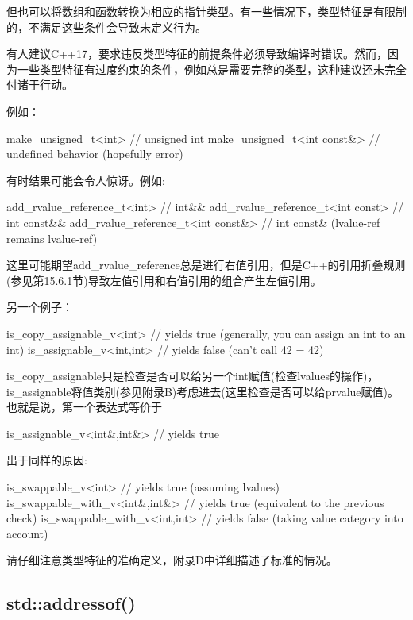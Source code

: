 但也可以将数组和函数转换为相应的指针类型。有一些情况下，类型特征是有限制的，不满足这些条件会导致未定义行为。

\begin{notice}
有人建议C++17，要求违反类型特征的前提条件必须导致编译时错误。然而，因为一些类型特征有过度约束的条件，例如总是需要完整的类型，这种建议还未完全付诸于行动。
\end{notice}

例如：

\begin{cpp}
make_unsigned_t<int> // unsigned int
make_unsigned_t<int const&> // undefined behavior (hopefully error)
\end{cpp}

有时结果可能会令人惊讶。例如:

\begin{cpp}
add_rvalue_reference_t<int> // int&&
add_rvalue_reference_t<int const> // int const&&
add_rvalue_reference_t<int const&> // int const& (lvalue-ref remains lvalue-ref)
\end{cpp}

这里可能期望add\_rvalue\_reference总是进行右值引用，但是C++的引用折叠规则(参见第15.6.1节)导致左值引用和右值引用的组合产生左值引用。

另一个例子：

\begin{cpp}
is_copy_assignable_v<int> // yields true (generally, you can assign an int to an int)
is_assignable_v<int,int> // yields false (can’t call 42 = 42)
\end{cpp}

is\_copy\_assignable只是检查是否可以给另一个int赋值(检查lvalues的操作)，is\_assignable将值类别(参见附录B)考虑进去(这里检查是否可以给prvalue赋值)。也就是说，第一个表达式等价于

\begin{cpp}
is_assignable_v<int&,int&> // yields true
\end{cpp}

出于同样的原因:

\begin{cpp}
is_swappable_v<int> // yields true (assuming lvalues)
is_swappable_with_v<int&,int&> // yields true (equivalent to the previous check)
is_swappable_with_v<int,int> // yields false (taking value category into account)
\end{cpp}

请仔细注意类型特征的准确定义，附录D中详细描述了标准的情况。

\subsection{std::addressof()}

